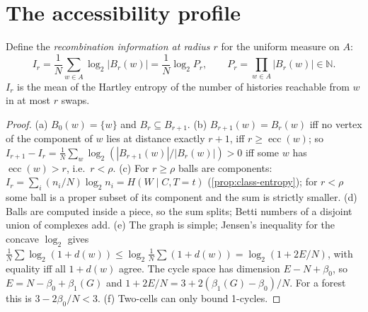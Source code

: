 \section{The accessibility profile}\label{sec:profile}
Define the \emph{recombination information at radius $r$} for the uniform measure on $A$:
\[
I_r=\frac1N\sum_{w\in A}\log_2|B_r(w)|=\frac1N\log_2P_r,\qquad P_r=\prod_{w\in A}|B_r(w)|\in\mathbb N .
\]
$I_r$ is the mean of the Hartley entropy of the number of histories reachable from $w$ in at most $r$ swaps.
\begin{proof}
(a) $B_0(w)=\{w\}$ and $B_r\subseteq B_{r+1}$. (b) $B_{r+1}(w)=B_r(w)$ iff no vertex of the component of $w$ lies at distance exactly $r+1$, iff $r\ge\operatorname{ecc}(w)$; so $I_{r+1}-I_r=\frac1N\sum_w\log_2(|B_{r+1}(w)|/|B_r(w)|)>0$ iff some $w$ has $\operatorname{ecc}(w)>r$, i.e.\ $r<\rho$. (c) For $r\ge\rho$ balls are components: $I_r=\sum_i(n_i/N)\log_2n_i=H(W\mid C,T=t)$ (\cref{prop:class-entropy}); for $r<\rho$ some ball is a proper subset of its component and the sum is strictly smaller. (d) Balls are computed inside a piece, so the sum splits; Betti numbers of a disjoint union of complexes add. (e) The graph is simple; Jensen's inequality for the concave $\log_2$ gives $\frac1N\sum\log_2(1+d(w))\le\log_2\frac1N\sum(1+d(w))=\log_2(1+2E/N)$, with equality iff all $1+d(w)$ agree. The cycle space has dimension $E-N+\beta_0$, so $E=N-\beta_0+\beta_1(G)$ and $1+2E/N=3+2(\beta_1(G)-\beta_0)/N$. For a forest this is $3-2\beta_0/N<3$. (f) Two-cells can only bound 1-cycles.
\end{proof}
